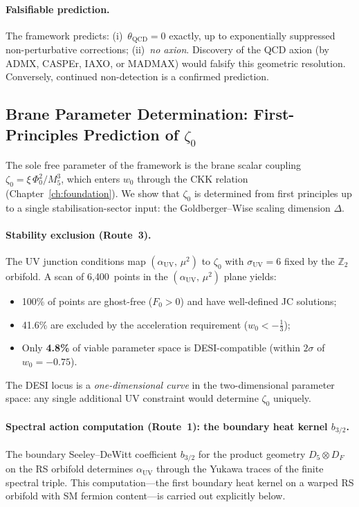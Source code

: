 \paragraph{Falsifiable prediction.}
The framework predicts: (i)~$\theta_{\mathrm{QCD}} = 0$ exactly, up to exponentially suppressed non-perturbative corrections; (ii)~\emph{no axion}.  Discovery of the QCD axion (by ADMX, CASPEr, IAXO, or MADMAX) would falsify this geometric resolution.  Conversely, continued non-detection is a confirmed prediction.


\subsection{Brane Parameter Determination: First-Principles Prediction of \texorpdfstring{$\zeta_0$}{zeta0}}
\label{sec:4-brane-parameter}

The sole free parameter of the framework is the brane scalar coupling $\zeta_0 = \xi\, \Phi_0^2 / M_5^3$, which enters $w_0$ through the CKK relation (Chapter~\ref{ch:foundation}).  We show that $\zeta_0$ is determined from first principles up to a single stabilisation-sector input: the Goldberger--Wise scaling dimension $\Delta$.

\paragraph{Stability exclusion (Route~3).}
The UV junction conditions map $(\alpha_{\mathrm{UV}},\, \mu^2)$ to $\zeta_0$ with $\sigma_{\mathrm{UV}} = 6$ fixed by the $\mathbb{Z}_2$ orbifold.  A scan of 6{,}400~points in the $(\alpha_{\mathrm{UV}},\, \mu^2)$ plane yields:
\begin{itemize}
  \item 100\% of points are ghost-free ($F_0 > 0$) and have well-defined JC solutions;
  \item 41.6\% are excluded by the acceleration requirement ($w_0 < -\tfrac{1}{3}$);
  \item Only \textbf{4.8\%} of viable parameter space is DESI-compatible (within $2\sigma$ of $w_0 = -0.75$).
\end{itemize}
The DESI locus is a \emph{one-dimensional curve} in the two-dimensional parameter space: any single additional UV constraint would determine $\zeta_0$ uniquely.

\paragraph{Spectral action computation (Route~1): the boundary heat kernel $b_{3/2}$.}
The boundary Seeley--DeWitt coefficient $b_{3/2}$ for the product geometry $D_5 \otimes D_F$ on the RS orbifold determines $\alpha_{\mathrm{UV}}$ through the Yukawa traces of the finite spectral triple.  This computation---the first boundary heat kernel on a warped RS orbifold with SM fermion content---is carried out explicitly below.

